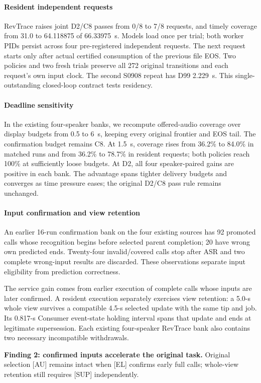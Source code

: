 \paragraph{Resident independent requests}
RevTrace raises joint D2/C8 passes from 0/8 to 7/8 requests, and timely
coverage from 31.0 to 64.118875 of 66.33975~s. Models load once per trial;
both worker PIDs persist across four pre-registered independent requests.
The next request starts only after actual certified consumption of the
previous file EOS. Two policies and two fresh trials preserve all 272
original transitions and each request's own input clock. The second
S0908 repeat has D99 2.229~s. This single-outstanding closed-loop contract
tests residency.

\paragraph{Deadline sensitivity}
In the existing four-speaker banks, we recompute offered-audio coverage over display budgets
from 0.5 to 6~s, keeping every original frontier and EOS tail.
The confirmation budget remains C8.
At 1.5~s, coverage rises from 36.2\% to 84.0\% in matched runs and
from 36.2\% to 78.7\% in resident requests; both policies reach 100\%
at sufficiently loose budgets. At D2, all four speaker-paired gains
are positive in each bank. The advantage spans tighter delivery budgets
and converges as time pressure eases; the original D2/C8 pass rule remains
unchanged.

\paragraph{Input confirmation and view retention}
An earlier 16-run confirmation bank on the four existing sources
has 92 promoted calls whose recognition
begins before selected parent completion; 20 have wrong own predicted
ends. Twenty-four invalid/covered calls stop after ASR and two complete
wrong-input results are discarded. These observations separate input
eligibility from prediction correctness.

The service gain comes from earlier execution of complete
calls whose inputs are later confirmed. A resident execution separately
exercises view retention: a 5.0-s whole view survives a compatible 4.5-s
selected update with the same tip and job. Its 0.817-s Consumer event-state
holding interval spans that update and ends at legitimate supersession.
Each existing four-speaker RevTrace bank also contains two necessary
incompatible withdrawals.
\par\noindent\textbf{Finding 2: confirmed inputs accelerate the original task.}
Original selection [AU] remains intact when [EL] confirms early full calls;
whole-view retention still requires [SUP] independently.
